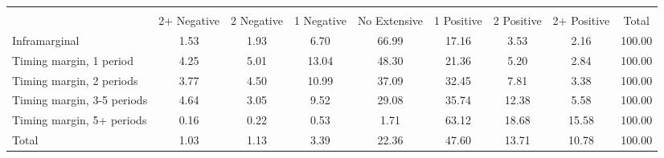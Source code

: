 \begin{tabular}{l*{8}{c}}
\hline\hline
                    &\multicolumn{8}{c}{}                                                                                   \\
                    & 2+ Negative&  2 Negative&  1 Negative&No Extensive&  1 Positive&  2 Positive& 2+ Positive&       Total\\
\hline
Inframarginal       &        1.53&        1.93&        6.70&       66.99&       17.16&        3.53&        2.16&      100.00\\
Timing margin, 1 period&        4.25&        5.01&       13.04&       48.30&       21.36&        5.20&        2.84&      100.00\\
Timing margin, 2 periods&        3.77&        4.50&       10.99&       37.09&       32.45&        7.81&        3.38&      100.00\\
Timing margin, 3-5 periods&        4.64&        3.05&        9.52&       29.08&       35.74&       12.38&        5.58&      100.00\\
Timing margin, 5+ periods&        0.16&        0.22&        0.53&        1.71&       63.12&       18.68&       15.58&      100.00\\
Total               &        1.03&        1.13&        3.39&       22.36&       47.60&       13.71&       10.78&      100.00\\
\hline\hline
\end{tabular}
